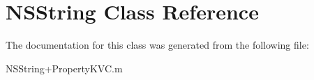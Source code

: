 \hypertarget{class_n_s_string}{
\section{NSString Class Reference}
\label{class_n_s_string}
}


The documentation for this class was generated from the following file:\begin{DoxyCompactItemize}
\item 
NSString+PropertyKVC.m\end{DoxyCompactItemize}
